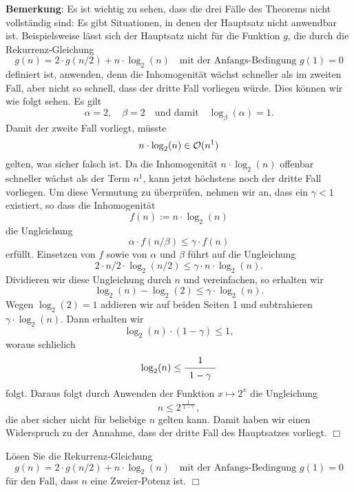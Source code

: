 \noindent
\textbf{Bemerkung}: Es ist wichtig zu sehen, dass die drei F\"alle des Theorems nicht vollst\"andig sind:
Es gibt Situationen, in denen der Hauptsatz nicht anwendbar ist.  Beispielsweise l\"asst sich der Hauptsatz nicht
f\"ur die Funktion $g$, die durch die Rekurrenz-Gleichung
\[ g(n) = 2 \cdot g(n/2) + n \cdot \log_2(n) \quad \mbox{mit der Anfangs-Bedingung $g(1) = 0$}\]
definiert ist, anwenden, denn die Inhomogenit\"at w\"achst schneller als im zweiten Fall, aber
nicht so schnell, dass der dritte Fall vorliegen w\"urde.  Dies k\"onnen wir wie folgt sehen.
Es gilt 
\[ \alpha = 2, \quad \beta = 2 \quad \mbox{und damit} \quad \log_\beta(\alpha) = 1. \]
Damit der zweite Fall vorliegt, m\"usste 
\[ n \cdot \log_2(n) \in \mathcal{O}(n^1) \]
gelten, was sicher falsch ist.  Da die Inhomogenit\"at $n \cdot \log_2(n)$ offenbar
schneller w\"achst als der Term $n^1$, kann jetzt h\"ochstens noch der dritte Fall vorliegen.
Um diese Vermutung zu \"uberpr\"ufen, nehmen wir an, dass ein $\gamma < 1$ existiert, so dass die Inhomogenit\"at 
\[ f(n) := n \cdot \log_2(n) \]
die Ungleichung 
\[ \alpha \cdot f(n/\beta) \leq \gamma \cdot f(n) \]
erf\"ullt.  Einsetzen von $f$ sowie von $\alpha$ und $\beta$ f\"uhrt auf die Ungleichung
\[ 2 \cdot n/2 \cdot \log_2(n/2) \leq \gamma \cdot n \cdot \log_2(n). \]
Dividieren wir diese Ungleichung durch $n$ und vereinfachen, so erhalten wir
\[ \log_2(n) - \log_2(2) \leq \gamma \cdot \log_2(n). \]
Wegen $\log_2(2) = 1$ addieren wir auf beiden Seiten 1 und subtrahieren $\gamma \cdot \log_2(n)$.
Dann erhalten wir
\[ \log_2(n) \cdot (1 - \gamma) \leq 1, \]
woraus schlie\3lich 
\[ \log_2(n) \leq \bruch{1}{\;1 - \gamma\;} \]
folgt.  Daraus folgt durch Anwenden der Funktion $x \mapsto 2^x$ die Ungleichung
\[ \displaystyle n \leq 2^\frac{1}{\;1 - \gamma\;}, \]
die aber sicher nicht f\"ur beliebige $n$ gelten kann.  Damit haben wir einen Widerspruch
zu der Annahme, dass der dritte Fall des Hauptsatzes vorliegt.
\hspace*{\fill} $\Box$
\vspace*{0.3cm}

\exercise
L\"osen Sie die Rekurrenz-Gleichung
\[ g(n) = 2 \cdot g(n/2) + n \cdot \log_2(n) \quad \mbox{mit der Anfangs-Bedingung $g(1) = 0$} \]
f\"ur den Fall, dass $n$ eine Zweier-Potenz ist.
\hspace*{\fill} $\Box$



